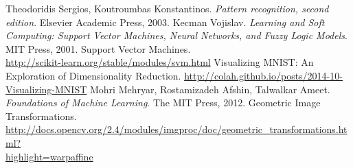 \documentclass[a4paper,12pt]{report}
\begin{document}
\begin{thebibliography}{9}
Theodoridis Sergios, Koutroumbas Konstantinos. \textit{Pattern recognition, second edition}. Elsevier Academic Press, 2003.
Kecman Vojislav. \textit{Learning and Soft Computing: Support Vector Machines, Neural Networks, and Fuzzy Logic Models}. MIT Press, 2001.
Support Vector Machines. \\
\href{http://scikit-learn.org/stable/modules/svm.html}{http://scikit-learn.org/stable/modules/svm.html}
Visualizing MNIST: An Exploration of Dimensionality Reduction.
\href{http://colah.github.io/posts/2014-10-Visualizing-MNIST}{http://colah.github.io/posts/2014-10-Visualizing-MNIST}
Mohri Mehryar, Rostamizadeh Afshin, Talwalkar Ameet. \textit{Foundations of Machine Learning}. The MIT Press, 2012.
Geometric Image Transformations. \\
\href{http://docs.opencv.org/2.4/modules/imgproc/doc/geometric\_transformations.html?\\highlight=warpaffine}{http://docs.opencv.org/2.4/modules/imgproc/doc/geometric\_transformations.html?\\highlight=warpaffine}




\end{thebibliography}
\end{document}
